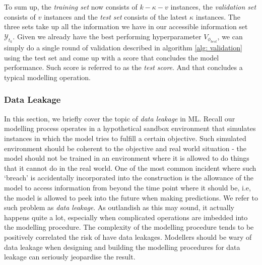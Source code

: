 To sum up, the \textit{training set} now consists of $k - \kappa - v$ instances, the \textit{validation set} consists of $v$ instances and the \textit{test set} consists of the latest $\kappa$ instances. The three sets take up all the information we have in our accessible information set $\mathcal{Y}_{t_k}$. Given we already have the best performing hyperparameter $V_{\phi_{best}}$, we can simply do a single round of validation described in algorithm \ref{alg: validation} using the test set and come up with a score that concludes the model performance. Such score is referred to as the \textit{test score}. And that concludes a typical modelling operation.

\subsubsection{Data Leakage}\label{subsubsec: data leakage}
In this section, we briefly cover the topic of \textit{data leakage} in ML. Recall our modelling process operates in a hypothetical sandbox environment that simulates instances in which the model tries to fulfill a certain objective. Such simulated environment should be coherent to the objective and real world situation - the model should not be trained in an environment where it is allowed to do things that it cannot do in the real world. One of the most common incident where such `breach' is accidentally incorporated into the construction is the allowance of the model to access information from beyond the time point where it should be, i.e, the model is allowed to peek into the future when making predictions. We refer to such problem as \textit{data leakage}. As outlandish as this may sound, it actually happens quite a lot, especially when complicated operations are imbedded into the modelling procedure. The complexity of the modelling procedure tends to be positively correlated the risk of have data leakages. Modellers should be wary of data leakage when designing and building the modelling procedures for data leakage can seriously jeopardise the result.

